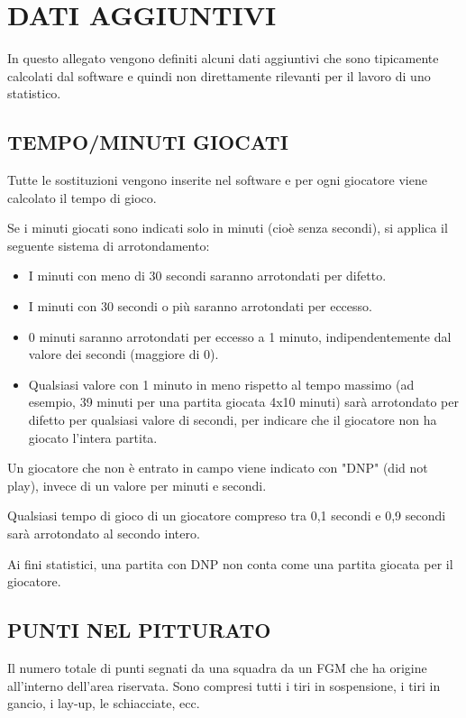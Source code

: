 \newpage
\section{DATI AGGIUNTIVI}
\sectionline

In questo allegato vengono definiti alcuni dati aggiuntivi che sono tipicamente calcolati dal software e quindi non direttamente rilevanti per il lavoro di uno statistico.

\subsection*{TEMPO/MINUTI GIOCATI}
\subsectionline
Tutte le sostituzioni vengono inserite nel software e per ogni giocatore viene calcolato il tempo di gioco.

Se i minuti giocati sono indicati solo in minuti (cioè senza secondi), si applica il seguente sistema di arrotondamento:
\begin{itemize}
    \item I minuti con meno di 30 secondi saranno arrotondati per difetto.
    \item I minuti con 30 secondi o più saranno arrotondati per eccesso.
    \item 0 minuti saranno arrotondati per eccesso a 1 minuto, indipendentemente dal valore dei secondi (maggiore di 0).
    \item Qualsiasi valore con 1 minuto in meno rispetto al tempo massimo (ad esempio, 39 minuti per una partita giocata 4x10 minuti) sarà arrotondato per difetto per qualsiasi valore di secondi, per indicare che il giocatore non ha giocato l'intera partita.
\end{itemize}

Un giocatore che non è entrato in campo viene indicato con "DNP" (did not play), invece di un valore per minuti e secondi. 

Qualsiasi tempo di gioco di un giocatore compreso tra 0,1 secondi e 0,9 secondi sarà arrotondato al secondo intero.

Ai fini statistici, una partita con DNP non conta come una partita giocata per il giocatore.

\subsection*{PUNTI NEL PITTURATO}
\subsectionline
Il numero totale di punti segnati da una squadra da un FGM che ha origine all'interno dell'area riservata. Sono compresi tutti i tiri in sospensione, i tiri in gancio, i lay-up, le schiacciate, ecc.

